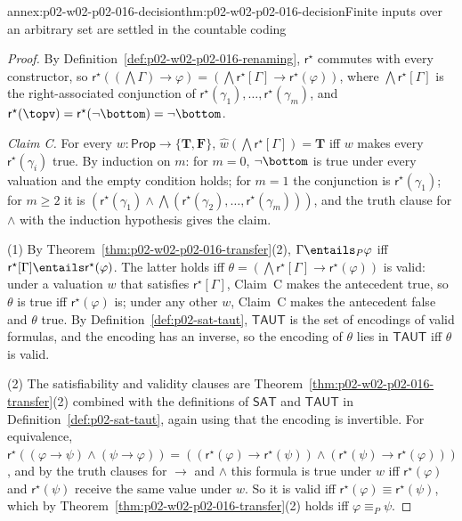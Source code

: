 \begin{annexitem}{annex:p02-w02-p02-016-decision}{thm:p02-w02-p02-016-decision}{Finite inputs over an arbitrary set are settled in the countable coding}
\begin{proof}
By Definition~\ref{def:p02-w02-p02-016-renaming}, \(\mathsf r^{\star}\) commutes
with every constructor, so
\(\mathsf r^{\star}((\bigwedge\Gamma)\to\varphi)=
(\bigwedge\mathsf r^{\star}[\Gamma]\to\mathsf r^{\star}(\varphi))\), where
\(\bigwedge\mathsf r^{\star}[\Gamma]\) is the right-associated conjunction of
\(\mathsf r^{\star}(\gamma_1),\ldots,\mathsf r^{\star}(\gamma_m)\), and
\(\mathsf r^{\star}(\topv)=\mathsf r^{\star}(\neg\bottom)=\neg\bottom\).

\emph{Claim C.}  For every \(w:\mathsf{Prop}\to\{\mathbf T,\mathbf F\}\),
\(\widehat w(\bigwedge\mathsf r^{\star}[\Gamma])=\mathbf T\) iff \(w\) makes every
\(\mathsf r^{\star}(\gamma_i)\) true.  By induction on \(m\): for \(m=0\),
\(\neg\bottom\) is true under every valuation and the empty condition holds;
for \(m=1\) the conjunction is \(\mathsf r^{\star}(\gamma_1)\); for \(m\ge2\) it
is \((\mathsf r^{\star}(\gamma_1)\land\bigwedge(\mathsf r^{\star}(\gamma_2),\ldots,
\mathsf r^{\star}(\gamma_m)))\), and the truth clause for \(\land\) with the
induction hypothesis gives the claim.

(1) By Theorem~\ref{thm:p02-w02-p02-016-transfer}(2),
\(\Gamma\entails_P\varphi\) iff
\(\mathsf r^{\star}[\Gamma]\entails\mathsf r^{\star}(\varphi)\).  The latter holds iff
\(\theta=(\bigwedge\mathsf r^{\star}[\Gamma]\to\mathsf r^{\star}(\varphi))\) is valid:
under a valuation \(w\) that satisfies \(\mathsf r^{\star}[\Gamma]\), Claim~C makes
the antecedent true, so \(\theta\) is true iff \(\mathsf r^{\star}(\varphi)\) is;
under any other \(w\), Claim~C makes the antecedent false and \(\theta\) true.
By Definition~\ref{def:p02-sat-taut}, \(\mathsf{TAUT}\) is the set of
encodings of valid formulas, and the encoding has an inverse, so the encoding
of \(\theta\) lies in \(\mathsf{TAUT}\) iff \(\theta\) is valid.

(2) The satisfiability and validity clauses are
Theorem~\ref{thm:p02-w02-p02-016-transfer}(2) combined with the definitions of
\(\mathsf{SAT}\) and \(\mathsf{TAUT}\) in Definition~\ref{def:p02-sat-taut},
again using that the encoding is invertible.  For equivalence,
\(\mathsf r^{\star}((\varphi\to\psi)\land(\psi\to\varphi))=
((\mathsf r^{\star}(\varphi)\to\mathsf r^{\star}(\psi))\land
(\mathsf r^{\star}(\psi)\to\mathsf r^{\star}(\varphi)))\), and by the truth clauses for
\(\to\) and \(\land\) this formula is true under \(w\) iff
\(\mathsf r^{\star}(\varphi)\) and \(\mathsf r^{\star}(\psi)\) receive the same value
under \(w\).  So it is valid iff
\(\mathsf r^{\star}(\varphi)\equiv\mathsf r^{\star}(\psi)\), which by
Theorem~\ref{thm:p02-w02-p02-016-transfer}(2) holds iff \(\varphi\equiv_P\psi\).


\end{proof}
\end{annexitem}
